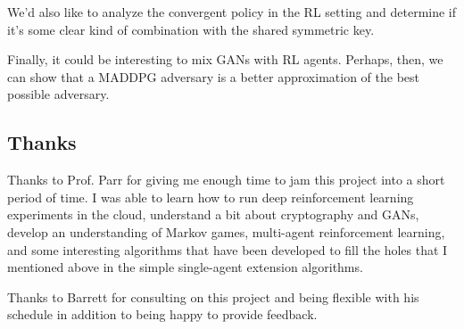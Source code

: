 \documentclass{llncs}
\begin{document}
We'd also like to analyze the convergent policy in the RL setting and determine if it's some clear kind of combination with the shared symmetric key. 

Finally, it could be interesting to mix GANs with RL agents. Perhaps, then, we can show that a MADDPG adversary is a better approximation of the best possible adversary. 
\subsection{Thanks}

Thanks to Prof. Parr for giving me enough time to jam this project into a short period of time. I was able to learn how to run deep reinforcement learning experiments in the cloud, understand a bit about cryptography and GANs, develop an understanding of Markov games, multi-agent reinforcement learning, and some interesting algorithms that have been developed to fill the holes that I mentioned above in the simple single-agent extension algorithms. 

Thanks to Barrett for consulting on this project and being flexible with his schedule in addition to being happy to provide feedback. 



\nocite{*}

%
%
%
\end{document}

